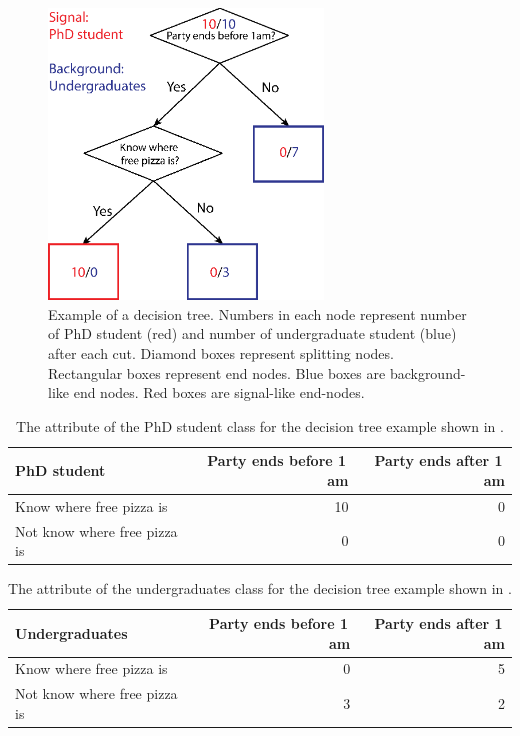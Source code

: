\begin{figure}[!tbp]
\includegraphics[width=0.65\textwidth]{doubleHiggs/mva/BDTcomic}
\caption[Example of a decision tree. ]
{Example of a decision tree. Numbers in each node represent number of PhD student (red) and number of undergraduate student (blue) after each cut. Diamond boxes represent splitting nodes. Rectangular boxes represent end nodes. Blue boxes are background-like end nodes. Red boxes are signal-like end-nodes.}
   \label{fig:doubleHiggsMVAdecisionTree}
\end{figure}

\begin{table}[!tbp]\centering

\begin{tabular}{lrr}
\hline \hline
PhD student & Party ends before 1\,am  & Party ends after 1\,am\\
\hline
Know where free pizza is & 10 & 0 \\
Not know where free pizza is & 0 & 0 \\
\hline \hline
\end{tabular}
\caption
{The attribute of the PhD student class for the decision tree example shown in .}
\label{tab:doubleHiggsDecisionTreeComic}
\end{table}
\begin{table}[!tbp]\centering

\begin{tabular}{lrr}
\hline \hline
Undergraduates & Party ends before 1\,am  & Party ends after 1\,am\\
\hline
Know where free pizza is & 0 & 5 \\
Not know where free pizza is & 3 & 2 \\
\hline \hline
\end{tabular}
\caption
{The attribute of  the undergraduates class for the decision tree example shown in .}
\label{tab:doubleHiggsDecisionTreeComic2}
\end{table}


